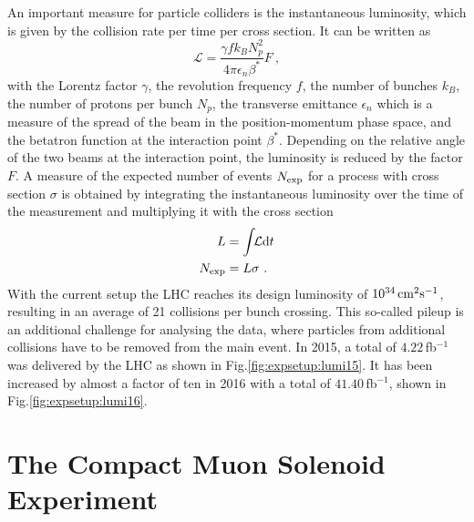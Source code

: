 \noindent An important measure for particle colliders is the instantaneous luminosity, which is given by the collision rate per time per cross section. It can be written as
\begin{equation}
\mathcal{L} = \frac{\gamma f k_B N_p^2}{4\pi \epsilon_n \beta^*}F ~ ,
\end{equation}
with the Lorentz factor $\gamma$, the revolution frequency $f$, the number of bunches $k_B$, the number of protons per bunch $N_p$, the transverse emittance $\epsilon_n$ which is a measure of the spread of the beam in the position-momentum phase space, and the betatron function at the interaction point $\beta^*$. Depending on the relative angle of the two beams at the interaction point, the luminosity is reduced by the factor $F$. A measure of the expected number of events $N_{\rm exp}$ for a process with cross section $\sigma$ is obtained by integrating the instantaneous luminosity over the time of the measurement and multiplying it with the cross section
\begin{align}
L &= \int \!\! \mathcal{L} {\rm d}t \\
N_{\rm exp} &= L \sigma ~.
\end{align}
With the current setup the LHC reaches its design luminosity of $10^{34}\,\rm{cm}^2\rm{s}^{-1}$, resulting in an average of 21 collisions per bunch crossing. This so-called pileup is an additional challenge for analysing the data, where particles from additional collisions have to be removed from the main event. In 2015, a total of $4.22$\,fb$^{-1}$ was delivered by the LHC as shown in Fig.\ref{fig:expsetup:lumi15}. It has been increased by almost a factor of ten in 2016 with a total of $41.40$\,fb$^{-1}$, shown in Fig.\ref{fig:expsetup:lumi16}.\\


\section{The Compact Muon Solenoid Experiment}

